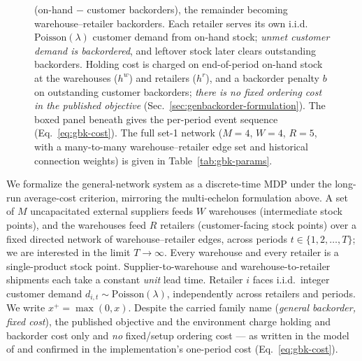 \documentclass[11pt]{article}
\begin{document}
\begin{figure}[t]
{  (on-hand $-$ customer backorders), the remainder becoming warehouse--retailer backorders. Each
  retailer serves its own i.i.d.\ $\mathrm{Poisson}(\lambda)$ customer demand from on-hand stock;
  \emph{unmet customer demand is backordered}, and leftover stock later clears outstanding backorders.
  Holding cost is charged on end-of-period on-hand stock at the warehouses ($h^w$) and retailers
  ($h^r$), and a backorder penalty $b$ on outstanding customer backorders; \emph{there is no fixed
  ordering cost in the published objective} (Sec.~\ref{sec:genbackorder-formulation}). The boxed panel
  beneath gives the per-period event sequence (Eq.~\eqref{eq:gbk-cost}). The full set-1 network
  ($M{=}4$, $W{=}4$, $R{=}5$, with a many-to-many warehouse--retailer edge set and historical
  connection weights) is given in Table~\ref{tab:gbk-params}.}
  \label{fig:env-genbackorder}
\end{figure}

We formalize the general-network system as a discrete-time MDP under the long-run average-cost
criterion, mirroring the multi-echelon formulation above. A set of $M$ uncapacitated external
suppliers feeds $W$ warehouses (intermediate stock points), and the warehouses feed $R$ retailers
(customer-facing stock points) over a fixed directed network of warehouse--retailer edges, across
periods $t\in\{1,2,\dots,T\}$; we are interested in the limit $T\to\infty$. Every warehouse and every
retailer is a single-product stock point. Supplier-to-warehouse and warehouse-to-retailer
shipments each take a constant \emph{unit} lead time. Retailer $i$ faces i.i.d.\ integer customer
demand $d_{i,t}\sim\mathrm{Poisson}(\lambda)$, independently across retailers and periods. We write
$x^+=\max(0,x)$. Despite the carried family name (\emph{general backorder, fixed cost}), the published
objective and the environment charge holding and backorder cost only and \emph{no} fixed/setup
ordering cost --- as written in the model of \citet{geevers2024cardboard} and confirmed in the
implementation's one-period cost (Eq.~\eqref{eq:gbk-cost}).
\end{document}

